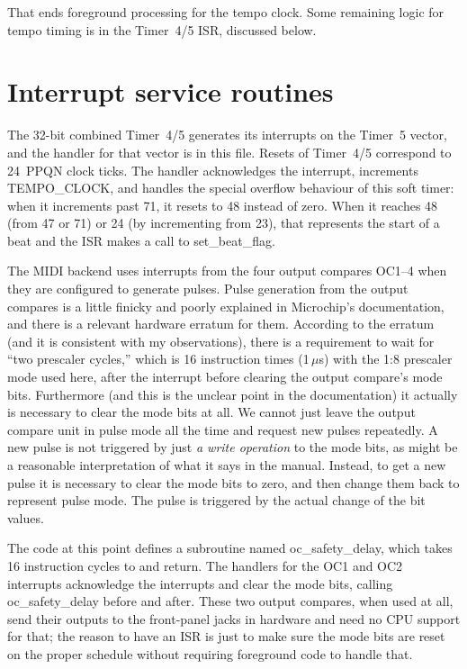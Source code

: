 That ends foreground processing for the tempo clock.  Some remaining logic
for tempo timing is in the Timer~4/5 ISR, discussed below.

\section{Interrupt service routines}

The 32-bit combined Timer~4/5 generates its interrupts on the Timer~5
vector, and the handler for that vector is in this file.  Resets of
Timer~4/5 correspond to 24~PPQN clock ticks.  The handler acknowledges the
interrupt, increments TEMPO\_CLOCK, and handles the special overflow
behaviour of this soft timer:  when it increments past 71, it resets to 48
instead of zero.  When it reaches 48 (from 47 or 71) or 24 (by incrementing
from 23), that represents the start of a beat and the ISR makes a call to
set\_beat\_flag.

The MIDI backend uses interrupts from the four output compares OC1--4 when
they are configured to generate pulses.  Pulse generation from the output
compares is a little finicky and poorly explained in Microchip's
documentation, and there is a relevant hardware erratum for them.  According
to the erratum (and it is consistent with my observations), there is a
requirement to wait for ``two prescaler cycles,'' which is 16 instruction
times (1\,$\mu$s) with the 1:8 prescaler mode used here, after the interrupt
before clearing the output compare's mode bits.  Furthermore (and this is
the unclear point in the documentation) it actually is necessary to clear
the mode bits at all.  We cannot just leave the output compare unit in pulse
mode all the time and request new pulses repeatedly.  A new pulse is not
triggered by just \emph{a write operation} to the mode bits, as might be a
reasonable interpretation of what it says in the manual.  Instead, to get a
new pulse it is necessary to clear the mode bits to zero, and then change
them back to represent pulse mode.  The pulse is triggered by the actual
change of the bit values.

The code at this point defines a subroutine named oc\_safety\_delay, which
takes 16 instruction cycles to  and return.  The handlers for
the OC1 and OC2 interrupts acknowledge the interrupts and clear the mode
bits, calling oc\_safety\_delay before and after.  These two output
compares, when used at all, send their outputs to the front-panel jacks in
hardware and need no CPU support for that; the reason to have an ISR is just
to make sure the mode bits are reset on the proper schedule without
requiring foreground code to handle that.

